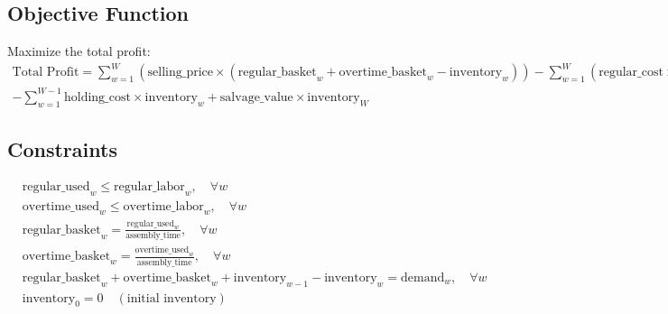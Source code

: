 \documentclass{article}
\begin{document}
\subsection*{Objective Function}
Maximize the total profit:
\begin{align*}
    \text{Total Profit} = \sum_{w=1}^{W} \left( \text{selling\_price} \times (\text{regular\_basket}_w + \text{overtime\_basket}_w - \text{inventory}_w) \right) - \sum_{w=1}^{W} \left( \text{regular\_cost} \times \text{regular\_used}_w + \text{overtime\_cost} \times \text{overtime\_used}_w \right) \\
    - \sum_{w=1}^{W-1} \text{holding\_cost} \times \text{inventory}_w + \text{salvage\_value} \times \text{inventory}_W
\end{align*}

\subsection*{Constraints}
\begin{align*}
    & \text{regular\_used}_w \leq \text{regular\_labor}_w, \quad \forall w \\
    & \text{overtime\_used}_w \leq \text{overtime\_labor}_w, \quad \forall w \\
    & \text{regular\_basket}_w = \frac{\text{regular\_used}_w}{\text{assembly\_time}}, \quad \forall w \\
    & \text{overtime\_basket}_w = \frac{\text{overtime\_used}_w}{\text{assembly\_time}}, \quad \forall w \\
    & \text{regular\_basket}_w + \text{overtime\_basket}_w + \text{inventory}_{w-1} - \text{inventory}_w = \text{demand}_w, \quad \forall w \\
    & \text{inventory}_0 = 0 \quad (\text{initial inventory})
\end{align*}
\end{document}
